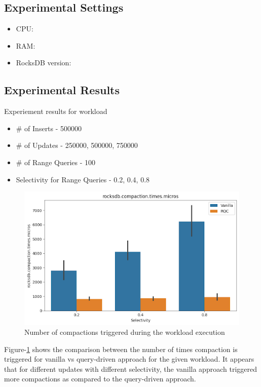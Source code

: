\subsection{Experimental Settings}
\begin{itemize}
    \item CPU\::
    \item RAM\::
    \item RocksDB version\::
\end{itemize}

\subsection{Experimental Results}
Experiement results for workload
\begin{itemize}
    \item \# of Inserts \-- 500000
    \item \# of Updates \-- 250000, 500000, 750000
    \item \# of Range Queries \-- 100 
    \item Selectivity for Range Queries \-- 0.2, 0.4, 0.8
\end{itemize}

\begin{figure}
    \includegraphics[scale=0.45]{Figures/Compaction Times.png}
    \caption{Number of compactions triggered during the workload execution}\label{fig:compaction_times}
\end{figure}

Figure-\ref{fig:compaction_times} shows the comparison between the number of times compaction is triggered for vanilla vs query-driven approach 
for the given workload. It appears that for different updates with different selectivity, the vanilla approach triggered 
more compactions as compared to the query-driven approach.

